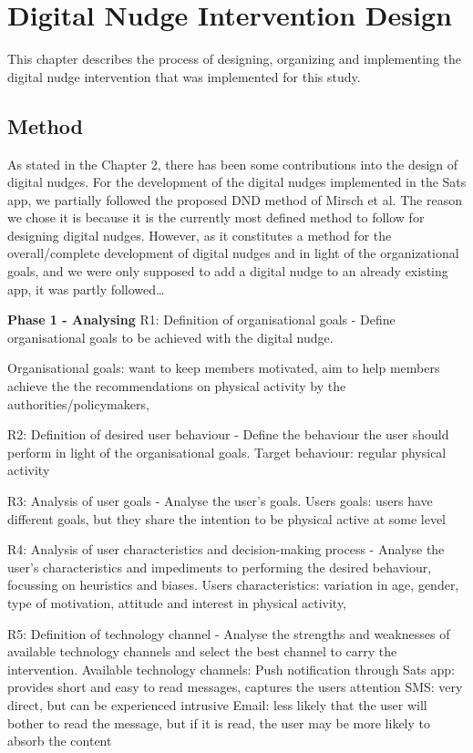\chapter{Digital Nudge Intervention Design}
This chapter describes the process of designing, organizing and implementing the digital nudge intervention that was implemented for this study.

\section{Method} 
As stated in the Chapter 2, there has been some contributions into the design of digital nudges. For the development of the digital nudges implemented in the Sats app, we partially followed the proposed DND method of Mirsch et al. The reason we chose it is because it is the currently most defined method to follow for designing digital nudges. However, as it constitutes a method for the overall/complete development of digital nudges and in light of the organizational goals, and we were only supposed to add a digital nudge to an already existing app, it was partly followed… 

\textbf{Phase 1 - Analysing}
R1: Definition of organisational goals - Define organisational goals to be achieved with the digital nudge. 

Organisational goals: want to keep members motivated, aim to help members achieve the the recommendations on physical activity by the authorities/policymakers, 

R2: Definition of desired user behaviour - Define the behaviour the user should perform in light of the organisational goals. 
Target behaviour: regular physical activity 

R3: Analysis of user goals - Analyse the user’s goals. 
Users goals: users have different goals, but they share the intention to be physical active at some level 

R4: Analysis of user characteristics and decision-making process - Analyse the user’s characteristics and impediments to performing the desired behaviour, focussing on heuristics and biases. 
Users characteristics: variation in age, gender, type of motivation, attitude and interest in physical activity,

R5: Definition of technology channel - Analyse the strengths and weaknesses of available technology channels and select the best channel to carry the intervention.
Available technology channels: 
Push notification through Sats app: provides short and easy to read messages, captures the users attention
SMS: very direct, but can be experienced intrusive 
Email: less likely that the user will bother to read the message, but if it is read, the user may be more likely to absorb the content

